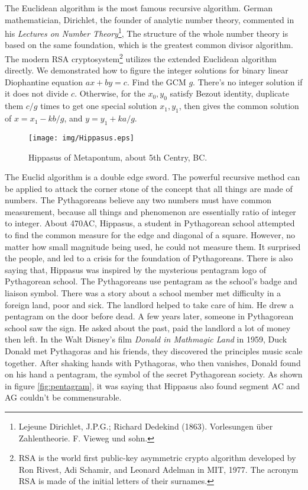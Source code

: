 \documentclass{article}
\begin{document}
The Euclidean algorithm is the most famous recursive algorithm. German mathematician, Dirichlet, the founder of analytic number theory, commented in his {\em Lectures on Number Theory}\footnote{Lejeune Dirichlet, J.P.G.; Richard Dedekind (1863). Vorlesungen über Zahlentheorie. F. Vieweg und sohn.}, The structure of the whole number theory is based on the same foundation, which is the greatest common divisor algorithm. The modern RSA cryptosystem\footnote{RSA is the world first public-key asymmetric crypto algorithm developed by Ron Rivest, Adi Schamir, and Leonard Adelman in MIT, 1977. The acronym RSA is made of the initial letters of their surnames.} utilizes the extended Euclidean algorithm directly. We demonstrated how to figure the integer solutions for binary linear Diophantine equation $ax + by = c$. Find the GCM $g$. There's no integer solution if it does not divide $c$. Otherwise, for the $x_0, y_0$ satisfy Bezout identity, duplicate them $c/g$ times to get one special solution $x_1, y_1$, then gives the common solution of $x = x_1 - k b / g$, and $y = y_1 + k a / g$.

\begin{wrapfigure}{R}{0.32\textwidth}
 \centering
 \texttt{[image: img/Hippasus.eps]}
 \captionsetup{labelformat=empty}
 \caption{Hippasus of Metapontum, about 5th Centry, BC.}
 \label{fig:Hippasus}
\end{wrapfigure}

The Euclid algorithm is a double edge sword. The powerful recursive method can be applied to attack the corner stone of the concept that all things are made of numbers. The Pythagoreans believe any two numbers must have common measurement, because all things and phenomenon are essentially ratio of integer to integer. About 470AC, Hippasus, a student in Pythagorean school attempted to find the common measure for the edge and diagonal of a square. However, no matter how small magnitude being used, he could not measure them. It surprised the people, and led to a crisis for the foundation of Pythagoreans. There is also saying that, Hippasus was inspired by the mysterious pentagram logo of Pythagorean school. The Pythagoreans use pentagram as the school's badge and liaison symbol. There was a story about a school member met difficulty in a foreign land, poor and sick. The landlord helped to take care of him. He drew a pentagram on the door before dead. A few years later, someone in Pythagorean school saw the sign. He asked about the past, paid the landlord a lot of money then left\cite{HanXueTao16}. In the Walt Disney's film {\em Donald in Mathmagic Land} in 1959, Duck Donald met Pythagoras and his friends, they discovered the principles music scale together. After shaking hands with Pythagoras, who then vanishes, Donald found on his hand a pentagram, the symbol of the secret Pythagorean society. As shown in figure \ref{fig:pentagram}, it was saying that Hippasus also found segment AC and AG couldn't be commensurable.
\end{document}
